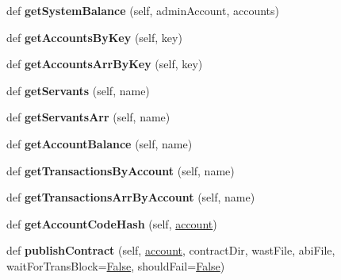 \begin{DoxyCompactItemize}
\item 
\mbox{\label{classtest_utils_1_1_node_ae0c7d6607cbbee7dd87280e2a76e3c97}} 
def {\bfseries get\+System\+Balance} (self, admin\+Account, accounts)
\item 
\mbox{\label{classtest_utils_1_1_node_abe6240816366baed750abe1f4d1514bf}} 
def {\bfseries get\+Accounts\+By\+Key} (self, key)
\item 
\mbox{\label{classtest_utils_1_1_node_af530d484bdf551952a05cd16be98450e}} 
def {\bfseries get\+Accounts\+Arr\+By\+Key} (self, key)
\item 
\mbox{\label{classtest_utils_1_1_node_a69b4b5c67708ed196461e5a71d307af9}} 
def {\bfseries get\+Servants} (self, name)
\item 
\mbox{\label{classtest_utils_1_1_node_a2e23edba722d802b5e767732dc935732}} 
def {\bfseries get\+Servants\+Arr} (self, name)
\item 
\mbox{\label{classtest_utils_1_1_node_ace837bb2e8499f2191a0762c33438b83}} 
def {\bfseries get\+Account\+Balance} (self, name)
\item 
\mbox{\label{classtest_utils_1_1_node_afe22ca4860874d017a25243f965c3c3a}} 
def {\bfseries get\+Transactions\+By\+Account} (self, name)
\item 
\mbox{\label{classtest_utils_1_1_node_a37b72d0cf6e198f62eea4ad4edce5688}} 
def {\bfseries get\+Transactions\+Arr\+By\+Account} (self, name)
\item 
\mbox{\label{classtest_utils_1_1_node_ae408d4731e7df44c464f024416c1837a}} 
def {\bfseries get\+Account\+Code\+Hash} (self, \mbox{\hyperlink{structaccount}{account}})
\item 
\mbox{\label{classtest_utils_1_1_node_a5a12036632b593ae241f980f12bc25af}} 
def {\bfseries publish\+Contract} (self, \mbox{\hyperlink{structaccount}{account}}, contract\+Dir, wast\+File, abi\+File, wait\+For\+Trans\+Block=\mbox{\hyperlink{struct_false}{False}}, should\+Fail=\mbox{\hyperlink{struct_false}{False}})

\end{DoxyCompactItemize}
